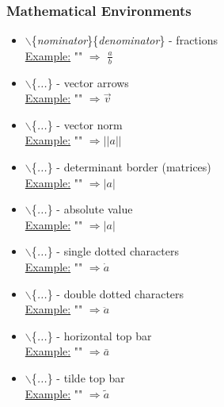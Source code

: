 \subsubsection{Mathematical Environments}

  \begin{itemize}
    \item $\backslash$\{\textit{nominator}\}\{\textit{denominator}\} - fractions\\
          \underline{Example:} "" $\Rightarrow$ $\frac{a}{b}$ \normalsize{ }
    \item $\backslash$\{\textit{...}\} - vector arrows\\
          \underline{Example:} "" $\Rightarrow \vec{v}$ \normalsize{ }
    \item $\backslash$\{\textit{...}\} - vector norm\\
          \underline{Example:} "" $\Rightarrow ||a||$ \normalsize{ }
    \item $\backslash$\{\textit{...}\} - determinant border (matrices)\\
          \underline{Example:} "" $\Rightarrow |a|$ \normalsize{ }
    \item $\backslash$\{\textit{...}\} - absolute value\\
          \underline{Example:} "" $\Rightarrow |a|$ \normalsize{ }
    \item $\backslash$\{\textit{...}\} - single dotted characters\\
          \underline{Example:} "" $\Rightarrow \dot{a}$ \normalsize{ }
    \item $\backslash$\{\textit{...}\} - double dotted characters\\
          \underline{Example:} "" $\Rightarrow \ddot{a}$ \normalsize{ }
    \item $\backslash$\{\textit{...}\} - horizontal top bar\\
          \underline{Example:} "" $\Rightarrow \bar{a}$ \normalsize{ }
    \item $\backslash$\{\textit{...}\} - tilde top bar\\
          \underline{Example:} "" $\Rightarrow \tilde{a}$ \normalsize{ }
  \end{itemize}
  
